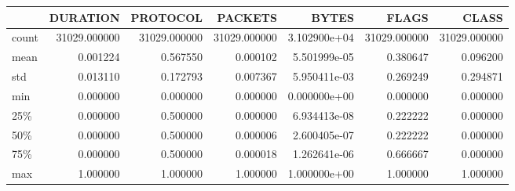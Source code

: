 \begin{tabular}{lrrrrrr}
\toprule
{} &      DURATION &      PROTOCOL &       PACKETS &         BYTES &         FLAGS &         CLASS \\
\midrule
count &  31029.000000 &  31029.000000 &  31029.000000 &  3.102900e+04 &  31029.000000 &  31029.000000 \\
mean  &      0.001224 &      0.567550 &      0.000102 &  5.501999e-05 &      0.380647 &      0.096200 \\
std   &      0.013110 &      0.172793 &      0.007367 &  5.950411e-03 &      0.269249 &      0.294871 \\
min   &      0.000000 &      0.000000 &      0.000000 &  0.000000e+00 &      0.000000 &      0.000000 \\
25\%   &      0.000000 &      0.500000 &      0.000000 &  6.934413e-08 &      0.222222 &      0.000000 \\
50\%   &      0.000000 &      0.500000 &      0.000006 &  2.600405e-07 &      0.222222 &      0.000000 \\
75\%   &      0.000000 &      0.500000 &      0.000018 &  1.262641e-06 &      0.666667 &      0.000000 \\
max   &      1.000000 &      1.000000 &      1.000000 &  1.000000e+00 &      1.000000 &      1.000000 \\
\bottomrule
\end{tabular}
